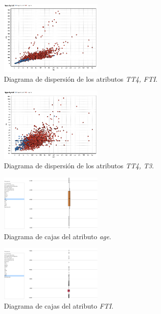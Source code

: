 \documentclass[osajnl,twocolumn,showpacs,superscriptaddress,10pt,floatfix]{revtex4-1} %
\begin{document}
\begin{figure}[H]
    \centering
    \includegraphics[width=0.45\textwidth]{analysis/scatter_TT4_FTI}
    \caption{Diagrama de dispersión de los atributos \textit{TT4, FTI}.}
    \label{figure:scatter_TT4_FTI}
\end{figure}

\begin{figure}[H]
    \centering
    \includegraphics[width=0.45\textwidth]{analysis/scatter_TT4_T3}
    \caption{Diagrama de dispersión de los atributos \textit{TT4, T3}.}
    \label{figure:scatter_TT4_T3}
\end{figure}

\begin{figure}[H]
    \centering
    \includegraphics[width=0.45\textwidth]{analysis/box_plot_age}
    \caption{Diagrama de cajas del atributo \textit{age}.}
    \label{figure:box_plot_age}
\end{figure}

\begin{figure}[H]
    \centering
    \includegraphics[width=0.45\textwidth]{analysis/box_plot_FTI}
    \caption{Diagrama de cajas del atributo \textit{FTI}.}
    \label{figure:box_plot_FTI}
\end{figure}
\end{document}
